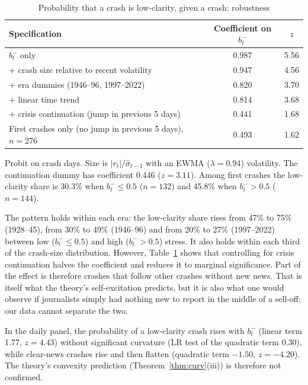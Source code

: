 \documentclass[11pt,a4paper]{article}
\theoremstyle{remark}
\begin{document}
\begin{table}[ht]
\centering
\begin{threeparttable}
\caption{Probability that a crash is low-clarity, given a crash: robustness}
\label{tab:robust}
\small
\begin{tabular}{lcc}
\toprule
Specification & Coefficient on $b^-_t$ & $z$ \\
\midrule
$b^-_t$ only & 0.987 & 5.56 \\
+ crash size relative to recent volatility & 0.947 & 4.56 \\
+ era dummies (1946--96, 1997--2022) & 0.820 & 3.70 \\
+ linear time trend & 0.814 & 3.68 \\
+ crisis continuation (jump in previous 5 days) & 0.441 & 1.68 \\
First crashes only (no jump in previous 5 days), $n=276$ & 0.493 & 1.62 \\
\bottomrule
\end{tabular}
\begin{tablenotes}\footnotesize
\item Probit on crash days. Size is $|r_t|/\hat\sigma_{t-1}$ with an EWMA ($\lambda=0.94$)
volatility. The continuation dummy has coefficient 0.446 ($z=3.11$). Among first crashes the
low-clarity share is 30.3\% when $b^-_t\le0.5$ ($n=132$) and 45.8\% when $b^-_t>0.5$
($n=144$).
\end{tablenotes}
\end{threeparttable}
\end{table}

The pattern holds within each era: the low-clarity share rises from 47\% to 75\% (1928--45),
from 30\% to 49\% (1946--96) and from 20\% to 27\% (1997--2022) between low ($b^-_t\le0.5$)
and high ($b^-_t>0.5$) stress. It also holds within each third of the crash-size
distribution. However, Table~\ref{tab:robust} shows that controlling for crisis
continuation halves the coefficient and reduces it to marginal significance. Part of the
effect is therefore crashes that follow other crashes without new news. That is itself what
the theory's self-excitation predicts, but it is also what one would observe if journalists
simply had nothing new to report in the middle of a sell-off; our data cannot separate the
two.

In the daily panel, the probability of a low-clarity crash rises with $b^-_t$ (linear term
1.77, $z=4.43$) without significant curvature (LR test of the quadratic term 0.30), while
clear-news crashes rise and then flatten (quadratic term $-1.50$, $z=-4.20$). The theory's
convexity prediction (Theorem~\ref{thm:curv}(iii)) is therefore not confirmed.
\end{document}
